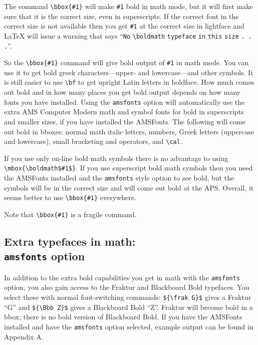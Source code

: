 The \REVTeX{} command \verb+\bbox{#1}+ will make \verb+#1+ bold in math
mode, but it will first make sure that it is the correct size, even in
superscripts. If the correct font in the correct size is not available then
you get \verb+#1+ at the correct size in lightface and \LaTeX{} will issue
a warning that says ``\verb+No+ \verb+\boldmath+ \verb+typeface+ \verb+in+
\verb+this+ \verb+size+ \verb+. . .+''.

So the \verb+\bbox{#1}+ command will give bold output of \verb+#1+ in math
mode. You can use it to get bold greek characters---upper- and
lowercase---and other symbols. It is still easier to use \verb+\bf+ to get
upright Latin letters in boldface. How much comes out bold and in how many
places you get bold output depends on how many fonts you have installed.
Using the \verb+amsfonts+ option will automatically use the extra AMS
Computer Modern math and symbol fonts for bold in superscripts and smaller
sizes, if you have installed the AMSFonts. The following will come out bold
in bboxes: normal math italic letters, numbers, Greek letters (uppercase
and lowercase), small bracketing and operators, and \verb+\cal+.

If you use only on-line bold math symbols there is no advantage to using
\verb+\mbox{\boldmath$#1$}+. If you use superscript bold math symbols then
you need the AMSFonts installed and the \verb+amsfonts+ style option to see
bold, but the symbols will be in the correct size and will come out bold at
the APS. Overall, it seems better to use \verb+\bbox{#1}+ everywhere.

Note that \verb+\bbox{#1}+ is a fragile command.

\subsection[Extra typefaces in math: {\protect\tt amsfonts} option]%
{Extra typefaces in math:\protect\\ {\protect\tt amsfonts} option}

In addition to the extra bold capabilities you get in math with the
\verb+amsfonts+ option, you also gain access to the Fraktur and Blackboard
Bold typefaces. You select these with normal font-switching commands:
\verb+${\frak G}$+ gives a Fraktur ``G'' and \verb+${\Bbb Z}$+ gives a
Blackboard Bold ``Z''. Fraktur will become bold in a bbox; there is no bold
version of Blackboard Bold. If you have the AMSFonts installed and have the
\verb+amsfonts+ option selected, example output can be found in Appendix A.


